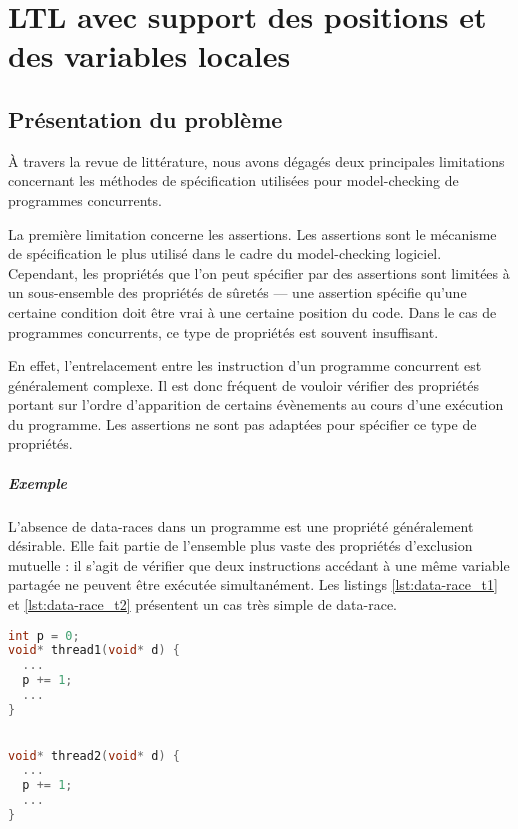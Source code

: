 \chapter{LTL avec support des positions et des variables locales}\label{sec:Theme1}

\section{Présentation du problème}

À travers la revue de littérature, nous avons dégagés deux principales
limitations concernant les méthodes de spécification utilisées pour
model-checking de programmes concurrents.

La première limitation concerne les assertions. Les assertions sont le mécanisme
de spécification le plus utilisé dans le cadre du model-checking logiciel.
Cependant, les propriétés que l'on peut spécifier par des assertions sont
limitées à un sous-ensemble des propriétés de sûretés --- une assertion spécifie
qu'une certaine condition doit être vrai à une certaine position du code. Dans
le cas de programmes concurrents, ce type de propriétés est souvent insuffisant.

En effet, l'entrelacement entre les instruction d'un programme concurrent est
généralement complexe. Il est donc fréquent de vouloir vérifier des propriétés
portant sur l'ordre d'apparition de certains évènements au cours d'une exécution
du programme. Les assertions ne sont pas adaptées pour spécifier ce type de
propriétés.

\paragraph{Exemple}
L'absence de data-races dans un programme est une propriété
généralement désirable. Elle fait partie de l'ensemble plus vaste des propriétés
d'exclusion mutuelle : il s'agit de vérifier que deux instructions accédant à
une même variable partagée ne peuvent être exécutée simultanément. Les listings
\ref{lst:data-race_t1} et \ref{lst:data-race_t2} présentent un cas très simple
de data-race.

\noindent\begin{minipage}{.45\textwidth}
  \begin{lstlisting}[language=C, frame=single, caption=Thread 1,
    label=lst:data-race_t1]
int p = 0;
void* thread1(void* d) {
  ...
  p += 1;
  ...
}
\end{lstlisting}
\end{minipage}\hfill
\begin{minipage}{.45\textwidth}
\begin{lstlisting}[language=C, frame=single, caption=Thread 2,
    label=lst:data-race_t2]

void* thread2(void* d) {
  ...
  p += 1;
  ...
}
\end{lstlisting}
\end{minipage}

